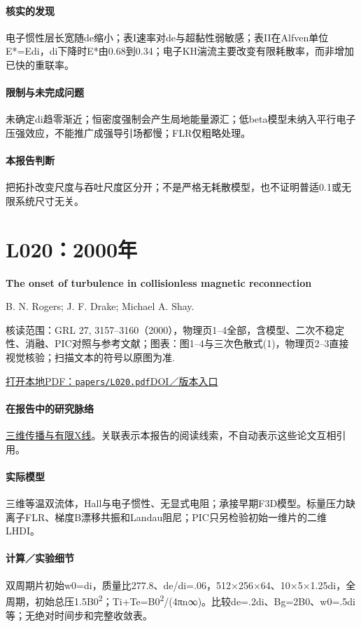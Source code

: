 \paragraph{核实的发现}电子惯性层长宽随de缩小；表I速率对de与超黏性弱敏感；表II在Alfven单位E*=Edi，di下降时E*由0.68到0.34；电子KH湍流主要改变有限耗散率，而非增加已快的重联率。

\paragraph{限制与未完成问题}未确定di趋零渐近；恒密度强制会产生局地能量源汇；低beta模型未纳入平行电子压强效应，不能推广成强导引场都慢；FLR仅粗略处理。

\paragraph{本报告判断}把拓扑改变尺度与吞吐尺度区分开；不是严格无耗散模型，也不证明普适0.1或无限系统尺寸无关。

\section{L020：2000年}\label{paper:L020}

\textbf{The onset of turbulence in collisionless magnetic reconnection}\citep{L020}\

B. N. Rogers;  J. F. Drake;  Michael A. Shay.

\textsf{核读范围：}GRL 27, 3157–3160（2000），物理页1–4全部，含模型、二次不稳定性、消融、PIC对照与参考文献；\textsf{图表：}图1–4与三次色散式(1)，物理页2–3直接视觉核验；扫描文本的符号以原图为准.

\href{run:papers/L020.pdf}{打开本地PDF：\texttt{papers/L020.pdf}}\quad\href{https://doi.org/10.1029/2000gl000038}{DOI／版本入口}

\paragraph{在报告中的研究脉络}\hyperref[story:three]{三维传播与有限X线}。关联表示本报告的阅读线索，不自动表示这些论文互相引用。

\paragraph{实际模型}三维等温双流体，Hall与电子惯性、无显式电阻；承接早期F3D模型。标量压力缺离子FLR、梯度B漂移共振和Landau阻尼；PIC只另检验初始一维片的二维LHDI。

\paragraph{计算／实验细节}双周期片初始w0=di，质量比277.8、de/di=.06，512×256×64、10×5×1.25di，全周期，初始总压1.5B0\textsuperscript{2}；Ti+Te=B0\textsuperscript{2}/(4πn∞)。比较de=.2di、Bg=2B0、w0=.5di等；无绝对时间步和完整收敛表。

